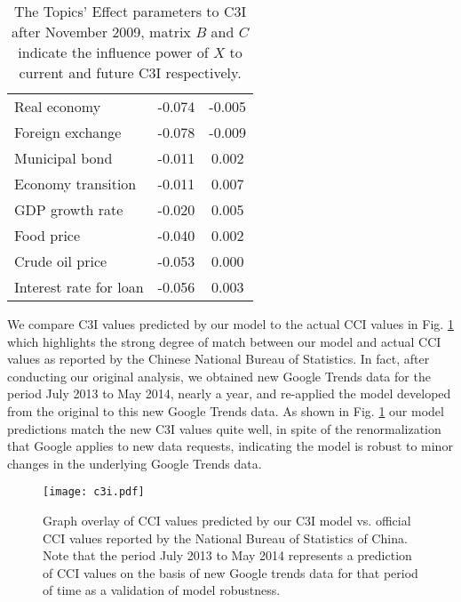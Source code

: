 \documentclass[10pt]{article}
\begin{document}
\begin {table}
\begin {center}
\begin {tabular} {lcc}
Real economy	               &	-0.074	&	-0.005	\\
Foreign exchange	       &	-0.078	&	-0.009	\\
\hline
Municipal bond	               &	-0.011	&	0.002	\\
Economy transition	       &	-0.011	&	0.007	\\
GDP growth rate	       &	-0.020	&	0.005	\\
Food price	               &	-0.040	&	0.002	\\
Crude oil price	               &	-0.053	&	0.000	\\
Interest rate for loan	       &	-0.056	&	0.003	\\

\hline
 \end {tabular}
 \caption{The Topics' Effect parameters to C3I after November 2009, matrix $B$ and $C$ indicate the influence power of $X$ to current and future C3I respectively.}
 \label{matrixBC}
 \end{center}
 \end {table}    



We compare C3I values predicted by our model to the actual CCI values in Fig. \ref{evaluation} which highlights the strong degree of match between our model and actual CCI values as reported by the Chinese National Bureau of Statistics. In fact, after conducting our original analysis, we obtained new Google Trends data for the period July 2013 to May 2014, nearly a year, and re-applied the model developed from the original to this new Google Trends data. As shown in Fig. \ref{evaluation} our model predictions match the new C3I values quite well, in spite of the renormalization that Google applies to new data requests, indicating the model is robust to minor changes in the underlying Google Trends data.

\begin{figure}[h!]
	\begin{center}
	\texttt{[image: c3i.pdf]}
\caption{ \label{evaluation} Graph overlay of CCI values predicted by our C3I model vs. official CCI values reported by the National Bureau of Statistics of China. Note that the period July 2013 to May 2014 represents a prediction of CCI values on the basis of new Google trends data for that period of time as a validation of model robustness.}
	\end{center}
\end{figure}
\end{document}
